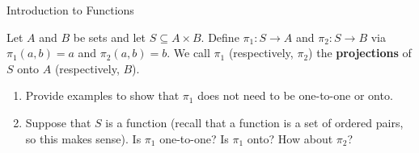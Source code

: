 \begin{section}{Introduction to Functions}
\begin{exercise}
Let $A$ and $B$ be sets and let $S\subseteq A\times B$.  Define $\pi_{1}:S\to A$ and $\pi_{2}:S\to B$ via $\pi_{1}(a,b)=a$ and $\pi_{2}(a,b)=b$.  We call $\pi_{1}$ (respectively, $\pi_{2}$) the \textbf{projections} of $S$ onto $A$ (respectively, $B$).
\begin{enumerate}[label=\textrm{(\alph*)}]
\item Provide examples to show that $\pi_{1}$ does not need to be one-to-one or onto.
\item Suppose that $S$ is a function (recall that a function is a set of ordered pairs, so this makes sense).  Is $\pi_{1}$ one-to-one? Is $\pi_{1}$ onto?  How about $\pi_{2}$?
\end{enumerate} 
\end{exercise}

\end{section}